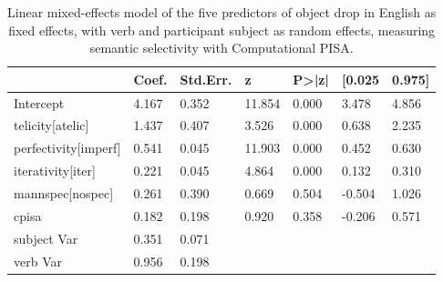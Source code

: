 \begin{table}[htb] %
\caption{Linear mixed-effects model of the five predictors of object drop in English as fixed effects, with verb and participant subject as random effects, measuring semantic selectivity with Computational PISA.}
\begin{tabular}{l|llllll}
                         & Coef. & Std.Err. & z      & P\textgreater{}|z| & {[}0.025 & 0.975{]} \\
\hline                         
Intercept                & 4.167 & 0.352    & 11.854 & 0.000              & 3.478    & 4.856    \\
telicity{[}atelic{]}     & 1.437 & 0.407    & 3.526  & 0.000              & 0.638    & 2.235    \\
perfectivity{[}imperf{]} & 0.541 & 0.045    & 11.903 & 0.000              & 0.452    & 0.630    \\
iterativity{[}iter{]}    & 0.221 & 0.045    & 4.864  & 0.000              & 0.132    & 0.310    \\
mannspec{[}nospec{]}     & 0.261 & 0.390    & 0.669  & 0.504              & -0.504   & 1.026    \\
cpisa                    & 0.182 & 0.198    & 0.920  & 0.358              & -0.206   & 0.571    \\
subject                 Var   & 0.351    & 0.071  &                    &          &    &        \\
verb                     Var   & 0.956    & 0.198  &                    &          &   &      
\end{tabular}  
\end{table}

